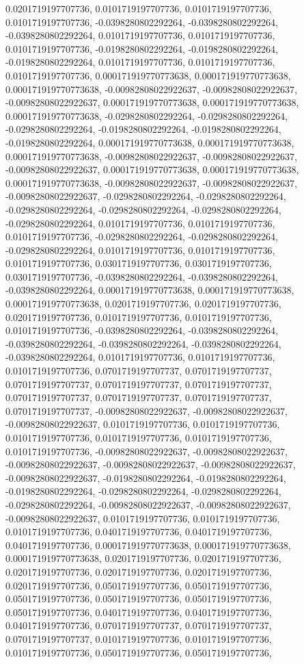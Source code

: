 \documentclass[
  ,man]{apa6}
\begin{document}
0.0201719197707736, 0.0101719197707736, 0.0101719197707736, 0.0101719197707736, -0.0398280802292264, -0.0398280802292264, -0.0398280802292264, 0.0101719197707736, 0.0101719197707736, 0.0101719197707736, -0.0198280802292264, -0.0198280802292264, -0.0198280802292264, 0.0101719197707736, 0.0101719197707736, 0.0101719197707736, 0.000171919770773638, 0.000171919770773638, 0.000171919770773638, -0.00982808022922637, -0.00982808022922637, -0.00982808022922637, 0.000171919770773638, 0.000171919770773638,
0.000171919770773638, -0.0298280802292264, -0.0298280802292264, -0.0298280802292264, -0.0198280802292264, -0.0198280802292264, -0.0198280802292264, 0.000171919770773638, 0.000171919770773638, 0.000171919770773638, -0.00982808022922637, -0.00982808022922637, -0.00982808022922637, 0.000171919770773638, 0.000171919770773638, 0.000171919770773638, -0.00982808022922637, -0.00982808022922637, -0.00982808022922637, -0.0298280802292264, -0.0298280802292264, -0.0298280802292264, -0.0298280802292264, -0.0298280802292264,
-0.0298280802292264, 0.0101719197707736, 0.0101719197707736, 0.0101719197707736, -0.0298280802292264, -0.0298280802292264, -0.0298280802292264, 0.0101719197707736, 0.0101719197707736, 0.0101719197707736, 0.0301719197707736, 0.0301719197707736, 0.0301719197707736, -0.0398280802292264, -0.0398280802292264, -0.0398280802292264, 0.000171919770773638, 0.000171919770773638, 0.000171919770773638, 0.0201719197707736, 0.0201719197707736, 0.0201719197707736, 0.0101719197707736, 0.0101719197707736, 0.0101719197707736,
-0.0398280802292264, -0.0398280802292264, -0.0398280802292264, -0.0398280802292264, -0.0398280802292264, -0.0398280802292264, 0.0101719197707736, 0.0101719197707736, 0.0101719197707736, 0.0701719197707737, 0.0701719197707737, 0.0701719197707737, 0.0701719197707737, 0.0701719197707737, 0.0701719197707737, 0.0701719197707737, 0.0701719197707737, 0.0701719197707737, -0.00982808022922637, -0.00982808022922637, -0.00982808022922637, 0.0101719197707736, 0.0101719197707736, 0.0101719197707736, 0.0101719197707736,
0.0101719197707736, 0.0101719197707736, -0.00982808022922637, -0.00982808022922637, -0.00982808022922637, -0.00982808022922637, -0.00982808022922637, -0.00982808022922637, -0.0198280802292264, -0.0198280802292264, -0.0198280802292264, -0.0298280802292264, -0.0298280802292264, -0.0298280802292264, -0.00982808022922637, -0.00982808022922637, -0.00982808022922637, 0.0101719197707736, 0.0101719197707736, 0.0101719197707736, 0.0401719197707736, 0.0401719197707736, 0.0401719197707736, 0.000171919770773638,
0.000171919770773638, 0.000171919770773638, 0.0201719197707736, 0.0201719197707736, 0.0201719197707736, 0.0201719197707736, 0.0201719197707736, 0.0201719197707736, 0.0501719197707736, 0.0501719197707736, 0.0501719197707736, 0.0501719197707736, 0.0501719197707736, 0.0501719197707736, 0.0401719197707736, 0.0401719197707736, 0.0401719197707736, 0.0701719197707737, 0.0701719197707737, 0.0701719197707737, 0.0101719197707736, 0.0101719197707736, 0.0101719197707736, 0.0501719197707736, 0.0501719197707736,
\end{document}
